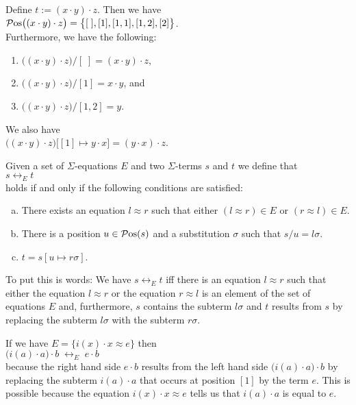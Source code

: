 \example
Define $t := (x \cdot y) \cdot z$.  Then we have
\\[0.2cm]
\hspace*{1.3cm}
$\mathcal{P}\mathrm{os}\bigl((x \cdot y) \cdot z\bigr) = \bigl\{ [\;], [1], [1,1], [1,2], [2]\bigr\}$.
\\[0.2cm]
Furthermore, we have the following:
\begin{enumerate}

\item $\bigl((x \cdot y) \cdot z\bigr)/[\;] = (x \cdot y) \cdot z$,
\item $\bigl((x \cdot y) \cdot z\bigr)/[1] = x \cdot y$, and
\item $\bigl((x \cdot y) \cdot z\bigr)/[1,2] = y$.
\end{enumerate}
We also have
\\[0.2cm]
\hspace*{1.3cm}
$\bigl((x \cdot y) \cdot z\bigr)\bigl[[1] \mapsto y \cdot x\bigr] = (y \cdot x) \cdot z$. \eox

\begin{Definition}[$\leftrightarrow_E$]
  Given a set of $\Sigma$-equations $E$ and two $\Sigma$-terms $s$ and $t$ we define that
  \\[0.2cm]
  \hspace*{1.3cm}
  $s \leftrightarrow_E t$
  \\[0.2cm]
  holds if and only if the following conditions are satisfied:
  \begin{enumerate}[(a)]
  \item There exists an equation $l \approx r$  such that either $(l \approx r) \in E$ or $(r \approx l) \in  E$.
  \item There is a position $u \in \mathcal{P}\mathrm{os}(s)$ and a substitution $\sigma$ such that $s/u = l\sigma$.
  \item $t = s[u \mapsto r\sigma]$. \eox
  \end{enumerate}
\end{Definition}
To put this is words: We have $s \leftrightarrow_E t$ iff there is an equation $l \approx r$ such that
either the equation $l \approx r$ or the equation $r \approx l$ is an element of the set of equations $E$ and,
furthermore, $s$ contains the subterm $l\sigma$ and $t$ results from $s$ by replacing the subterm $l\sigma$
with the subterm $r\sigma$. 

\example
If we have $E = \bigl\{ i(x) \cdot x \approx e \bigr\}$ then
\\[0.2cm]
\hspace*{1.3cm}
$\bigl(i(a) \cdot a\bigr) \cdot b \;\leftrightarrow_E\; e \cdot b$
\\[0.2cm]
because the right hand side $e \cdot b$ results from the left hand side $\bigl(i(a) \cdot a\bigr) \cdot b$ by
replacing the subterm $i(a) \cdot a$ that occurs at position $[1]$ by the term $e$.
This is possible because the equation $i(x) \cdot x \approx e$ tells us that $i(a) \cdot a$ is equal to $e$.
\eod

